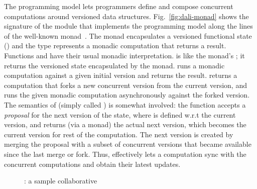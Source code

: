 The \name programming model lets programmers define and compose
concurrent computations around versioned data structures.
Fig.~\ref{fig:dali-monad} shows the signature of the \name module that
implements the programming model along the lines of the well-known
 monad~\cite{wadler-monad}. The monad encapsulates a
versioned functional state () and the type 
represents a monadic computation that returns a  result.
Functions  and  have their usual monadic
interpretation.  is like the 
monad's ; it returns the versioned state encapsulated by the
monad.  runs a monadic computation against
a given initial version and returns the result. 
returns a computation that forks a new concurrent version from the
current version, and runs the given monadic computation asynchronously
against the forked version.  The semantics of 
(simply called ) is somewhat involved: the function accepts a
\emph{proposal} for the next version of the state, where  is
defined w.r.t the current version, and returns (via a monad) the
actual next version, which becomes the current version for rest of the
computation.  The next version is created by merging the proposal with
a subset of concurrent versions that became available since the last
merge or fork. Thus,  effectively lets a computation sync with
the concurrent computations and obtain their latest updates.

\begin{figure}



\caption{\drawsome: a sample collaborative }
\label{fig:dali-canvas}
\end{figure}
